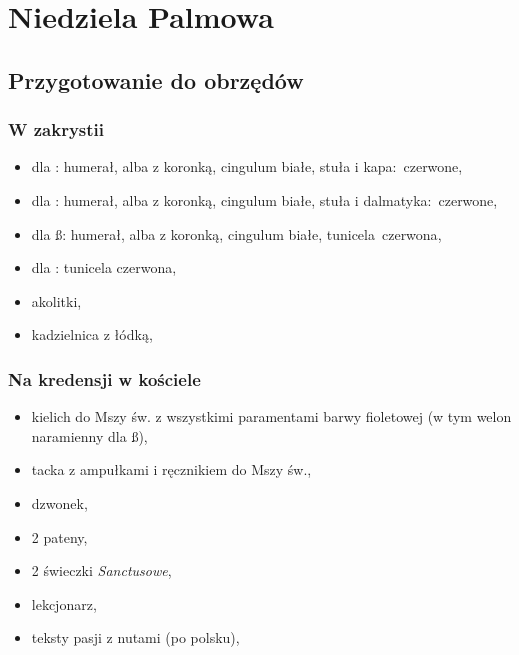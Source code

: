 \chapter{Niedziela Palmowa}

\section{Przygotowanie do obrzędów}
		
		\subsection{W zakrystii}
		
			\begin{itemize}
   				\item dla \ii: humerał, alba z koronką, cingulum białe, stuła i kapa: {\color{red}czerwone},
				\item dla \dd: humerał, alba z koronką, cingulum białe, stuła i dalmatyka: {\color{red}czerwone},
				\item dla \ss: humerał, alba z koronką, cingulum białe, tunicela {\color{red}czerwona},
				\item dla : tunicela {\color{red}czerwona},
				\item akolitki,
				\item kadzielnica z łódką, 
			\end{itemize}
		
		\subsection{Na kredensji w kościele}
		
			\begin{itemize}
				\item kielich do Mszy św. z wszystkimi paramentami barwy  {\color{violet}fioletowej} (w tym welon naramienny dla \ss),
				\item tacka z ampułkami i ręcznikiem do Mszy św.,
				\item dzwonek,
				\item 2 pateny,
				\item 2 świeczki \textit{Sanctusowe},
				\item lekcjonarz,
				\item teksty pasji z nutami (po polsku),
			\end{itemize}
		
			
